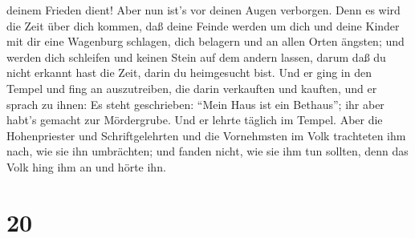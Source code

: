 deinem Frieden dient! Aber nun ist's vor deinen Augen verborgen.
 Denn es wird die Zeit über dich kommen, daß deine Feinde
werden um dich und deine Kinder mit dir eine Wagenburg schlagen, dich
belagern und an allen Orten ängsten;  und werden dich
schleifen und keinen Stein auf dem andern lassen, darum daß du nicht
erkannt hast die Zeit, darin du heimgesucht bist.  Und er
ging in den Tempel und fing an auszutreiben, die darin verkauften und
kauften,  und er sprach zu ihnen: Es steht geschrieben:
``Mein Haus ist ein Bethaus''; ihr aber habt's gemacht zur Mördergrube.
 Und er lehrte täglich im Tempel. Aber die Hohenpriester
und Schriftgelehrten und die Vornehmsten im Volk trachteten ihm nach,
wie sie ihn umbrächten;  und fanden nicht, wie sie ihm tun
sollten, denn das Volk hing ihm an und hörte ihn.

\hypertarget{section-19}{%
\section{20}\label{section-19}}


